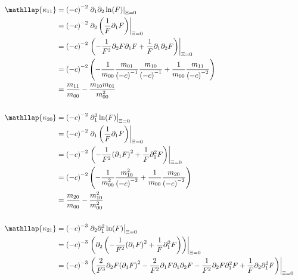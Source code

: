 \begin{align*}
  \phantom{\kappa_{00}}
  &\begin{aligned}
  \nonumber
    \mathllap{\kappa_{11}} & = {(-c)}^{-2} \left.\partial_1 \partial_2 \ln(F) \right|_{\Xi = 0} \\
    & = {(-c)}^{-2} \left.\partial_2 \left( \frac{1}{F} \partial_1 F \right) \right|_{\Xi = 0} \\
    & = {(-c)}^{-2} \left.\left( -\frac{1}{F^2} \partial_2 F \partial_1 F + \frac{1}{F} \partial_1\partial_2 F \right) \right|_{\Xi = 0} \\
    & = {(-c)}^{-2} \left(
      - \frac{1}{m_{00}} \frac{m_{01}}{{(-c)}^{-1}} \frac{m_{10}}{{(-c)}^{-1}}
      + \frac{1}{m_{00}} \frac{m_{11}}{{(-c)}^{-2}}
      \right) \\
    & = \frac{m_{11}}{m_{00}} - \frac{m_{10}m_{01}}{m_{00}^2}
  \end{aligned} \\
  \\
  &\begin{aligned}
  \nonumber
  \mathllap{\kappa_{20}} & = {(-c)}^{-2} \left.\partial_1^2 \ln(F) \right|_{\Xi = 0} \\
  & = {(-c)}^{-2} \left.\partial_1 \left( \frac{1}{F} \partial_1 F \right) \right|_{\Xi = 0} \\
  & = {(-c)}^{-2} \left.\left( -\frac{1}{F^2} {(\partial_1 F)}^2 + \frac{1}{F} \partial_1^2 F \right) \right|_{\Xi = 0} \\
  & = {(-c)}^{-2} \left(
    - \frac{1}{m_{00}^2} \frac{m_{10}^2}{{(-c)}^{-2}}
    + \frac{1}{m_{00}} \frac{m_{20}}{{(-c)}^{-2}}
    \right)\\
  & = \frac{m_{20}}{m_{00}} - \frac{m_{10}^2}{m_{00}^2}
  \end{aligned} \\
  \\
  &\begin{aligned}
  \nonumber
  \mathllap{\kappa_{21}} & = {(-c)}^{-3} \left. \partial_2 \partial_1^2 \ln(F) \right|_{\Xi = 0} \\
  & = {(-c)}^{-3} \left.\left(\partial_2\left( -\frac{1}{F^2} {(\partial_1 F)}^2 + \frac{1}{F} \partial_1^2 F \right)\right) \right|_{\Xi = 0} \\
  & = {(-c)}^{-3} \left.\left(
      \frac{2}{F^3} \partial_2 F {(\partial_1 F)}^2
    - \frac{2}{F^2} \partial_1 F \partial_1 \partial_2 F
    - \frac{1}{F^2} \partial_2 F \partial_1^2 F
    + \frac{1}{F} \partial_2 \partial_1^2 F
    \right)\right|_{\Xi = 0}\\

\end{aligned}
\end{align*}
